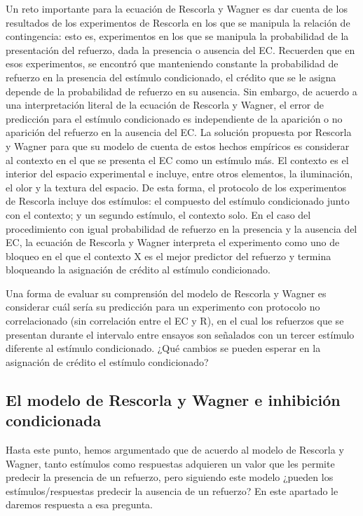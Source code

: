 \documentclass[
  letterpaper,
]{book}
\begin{document}
Un reto importante para la ecuación de Rescorla y Wagner es dar cuenta
de los resultados de los experimentos de Rescorla en los que se manipula
la relación de contingencia: esto es, experimentos en los que se
manipula la probabilidad de la presentación del refuerzo, dada la
presencia o ausencia del EC. Recuerden que en esos experimentos, se
encontró que manteniendo constante la probabilidad de refuerzo en la
presencia del estímulo condicionado, el crédito que se le asigna depende
de la probabilidad de refuerzo en su ausencia. Sin embargo, de acuerdo a
una interpretación literal de la ecuación de Rescorla y Wagner, el error
de predicción para el estímulo condicionado es independiente de la
aparición o no aparición del refuerzo en la ausencia del EC. La solución
propuesta por Rescorla y Wagner para que su modelo de cuenta de estos
hechos empíricos es considerar al contexto en el que se presenta el EC
como un estímulo más. El contexto es el interior del espacio
experimental e incluye, entre otros elementos, la iluminación, el olor y
la textura del espacio. De esta forma, el protocolo de los experimentos
de Rescorla incluye dos estímulos: el compuesto del estímulo
condicionado junto con el contexto; y un segundo estímulo, el contexto
solo. En el caso del procedimiento con igual probabilidad de refuerzo en
la presencia y la ausencia del EC, la ecuación de Rescorla y Wagner
interpreta el experimento como uno de bloqueo en el que el contexto X es
el mejor predictor del refuerzo y termina bloqueando la asignación de
crédito al estímulo condicionado.

Una forma de evaluar su comprensión del modelo de Rescorla y Wagner es
considerar cuál sería su predicción para un experimento con protocolo no
correlacionado (sin correlación entre el EC y R), en el cual los
refuerzos que se presentan durante el intervalo entre ensayos son
señalados con un tercer estímulo diferente al estímulo condicionado.
¿Qué cambios se pueden esperar en la asignación de crédito el estímulo
condicionado?

\subsection{El modelo de Rescorla y Wagner e inhibición
condicionada}\label{el-modelo-de-rescorla-y-wagner-e-inhibiciuxf3n-condicionada}

Hasta este punto, hemos argumentado que de acuerdo al modelo de Rescorla
y Wagner, tanto estímulos como respuestas adquieren un valor que les
permite predecir la presencia de un refuerzo, pero siguiendo este modelo
¿pueden los estímulos/respuestas predecir la ausencia de un refuerzo? En
este apartado le daremos respuesta a esa pregunta.
\end{document}
